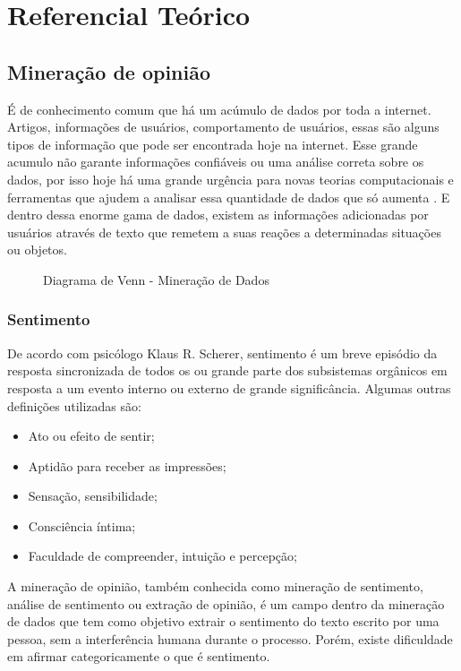 \chapter{Referencial Teórico}\label{cap:referencial_teorico}

\section{Mineração de opinião}\label{sec:mineracao_dados}

É de conhecimento comum que há um acúmulo de dados por toda a internet. Artigos, informações de usuários, comportamento de usuários, essas são alguns tipos de informação que pode ser encontrada hoje na internet. Esse grande acumulo não garante informações confiáveis ou uma análise correta sobre os dados, por isso hoje há uma grande urgência para novas teorias computacionais e ferramentas que ajudem a analisar essa quantidade de dados que só aumenta \cite{fayyad1996data}. E dentro dessa enorme gama de dados, existem as informações adicionadas por usuários através de texto que remetem a suas reações a determinadas situações ou objetos.

\begin{figure}[ht]
	\centering{}
	\caption{Diagrama de Venn - Mineração de Dados}
	\label{uni}
\end{figure}

\subsection{Sentimento}
De acordo com psicólogo Klaus R. Scherer, sentimento é um breve episódio da resposta sincronizada de todos os ou grande parte dos subsistemas orgânicos em resposta a um evento interno ou externo de grande significância\cite{scherer2001emotional}. Algumas outras definições utilizadas são:
\begin{itemize}
	\item Ato ou efeito de sentir;
	\item Aptidão para receber as impressões;
	\item Sensação, sensibilidade;
	\item Consciência íntima;
	\item Faculdade de compreender, intuição e percepção;
\end{itemize}

A mineração de opinião, também conhecida como mineração de sentimento, análise de sentimento ou extração de opinião, é um campo dentro da mineração de dados \cite{santos2014mineraccao} que tem como objetivo extrair o sentimento do texto escrito por uma pessoa, sem a interferência humana durante o processo. Porém, existe dificuldade em afirmar categoricamente o que é sentimento. 

